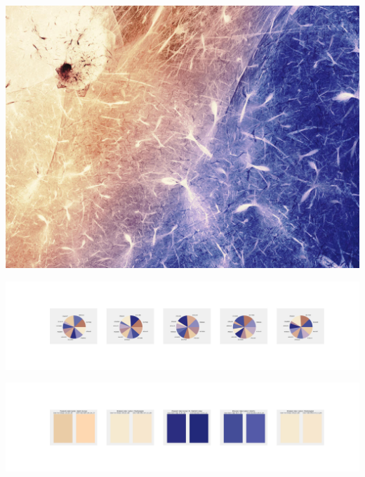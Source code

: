 \documentclass[11pt]{article}
\begin{document}
\begin{landscape}
    \begin{center}
    \includegraphics[width=\textwidth]{./nbimg/file (146).jpg}
    \end{center}

    \begin{center}
    \includegraphics[width=250mm]{./nbimg/pie-52.jpg}
    \end{center}

    \begin{center}
    \includegraphics[width=250mm]{./nbimg/peak-52.jpg}
    \end{center}
    


\end{landscape}
\end{document}
